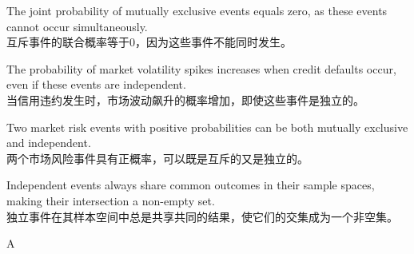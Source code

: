 \documentclass{article}
\begin{document}
        \begin{choices}
            \item The joint probability of mutually exclusive events equals zero, as these events cannot occur simultaneously.\\
            互斥事件的联合概率等于0，因为这些事件不能同时发生。
            \item The probability of market volatility spikes increases when credit defaults occur, even if these events are independent.\\
            当信用违约发生时，市场波动飙升的概率增加，即使这些事件是独立的。
            \item Two market risk events with positive probabilities can be both mutually exclusive and independent.\\
            两个市场风险事件具有正概率，可以既是互斥的又是独立的。
            \item Independent events always share common outcomes in their sample spaces, making their intersection a non-empty set.\\
            独立事件在其样本空间中总是共享共同的结果，使它们的交集成为一个非空集。
        \end{choices}
        
        \begin{correctanswer}
            A
        \end{correctanswer}
        
\end{document}
